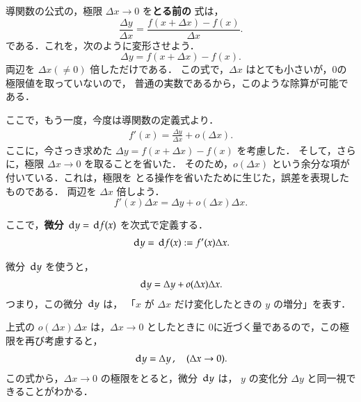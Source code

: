             導関数の公式の，極限 $\Delta x\rightarrow 0$ を\textbf{とる前の}
            式は，
                \begin{equation*}
                    \frac{\Delta y}{\Delta x}
                    = \frac{f(x+\Delta x)-f(x)}{\Delta x}.
                \end{equation*}
            である．これを，次のように変形させよう．
            \begin{equation*}
                \Delta y = f(x+\Delta x)-f(x).
            \end{equation*}
            両辺を $\Delta x(\neq 0)$ 倍しただけである．
            この式で，$\Delta x$ はとても小さいが，0の極限値を取っていないので，
            普通の実数であるから，このような除算が可能である．

            ここで，もう一度，今度は導関数の定義式より．
                \begin{align*}
                    f'(x) = \frac{\Delta y}{\Delta x}+o(\Delta x).
                \end{align*}
            ここに，今さっき求めた $\Delta y = f(x+\Delta x)-f(x)$ を考慮した．
            そして，さらに，極限 $\Delta x\rightarrow 0$ を取ることを省いた．
            そのため，$o(\Delta x)$ という余分な項が付いている．これは，極限を
            とる操作を省いたために生じた，誤差を表現したものである．
            両辺を $\Delta x$ 倍しよう．
                \begin{equation*}
                    f'(x) \Delta x = \Delta y + o(\Delta x)\Delta x.
                \end{equation*}

            ここで，\textbf{微分}  $\,\mathrm{d} y= \,\mathrm{d} f(x)$ を次式で定義する．
                \begin{align}
                    \,\mathrm{d} y = \,\mathrm{d} f(x) := f'(x)\Delta x.
                \end{align}

            微分 $\,\mathrm{d} y$ を使うと，
                \begin{align}
                    \,\mathrm{d} y = \Delta y + o(\Delta x)\Delta x.
                \end{align}
            つまり，この微分 $\,\mathrm{d} y$ は，
            「$x$ が $\Delta x$ だけ変化したときの $y$ の増分」を表す．

            上式の $o(\Delta x)\Delta x$ は，$\Delta x \rightarrow 0$ としたときに
            0に近づく量であるので，この極限を再び考慮すると，
                \begin{align}
                    \,\mathrm{d} y = \Delta y \,,\quad (\Delta x \rightarrow 0).
                \end{align}
            この式から，$\Delta x \rightarrow 0$ の極限をとると，微分 $\,\mathrm{d} y$ は，
            $y$ の変化分 $\Delta y$ と同一視できることがわかる．

